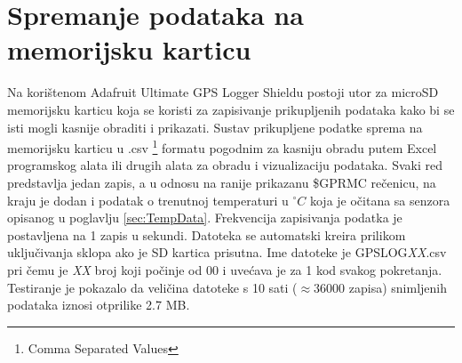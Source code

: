 \section{Spremanje podataka na memorijsku karticu}
Na korištenom Adafruit Ultimate GPS Logger Shieldu postoji utor za microSD memorijsku karticu koja se koristi za zapisivanje prikupljenih podataka kako bi se isti mogli kasnije obraditi i prikazati.
Sustav prikupljene podatke sprema na memorijsku karticu u .csv \footnote{Comma Separated Values} formatu pogodnim za kasniju obradu putem Excel programskog alata ili drugih alata za obradu i vizualizaciju podataka.
Svaki red predstavlja jedan zapis, a u odnosu na ranije prikazanu \$GPRMC rečenicu, na kraju je dodan i podatak o trenutnoj temperaturi u $^\circ C$ koja je očitana sa senzora opisanog u poglavlju \ref{sec:TempData}.
Frekvencija zapisivanja podatka je postavljena na 1 zapis u sekundi.
Datoteka se automatski kreira prilikom uključivanja sklopa ako je SD kartica prisutna.
Ime datoteke je GPSLOG\textit{XX}.csv pri čemu je \textit{XX} broj koji počinje od 00 i uvećava je za 1 kod svakog pokretanja. 
Testiranje je pokazalo da veličina datoteke s 10 sati ($\approx 36000$ zapisa) snimljenih podataka iznosi otprilike 2.7 MB.
